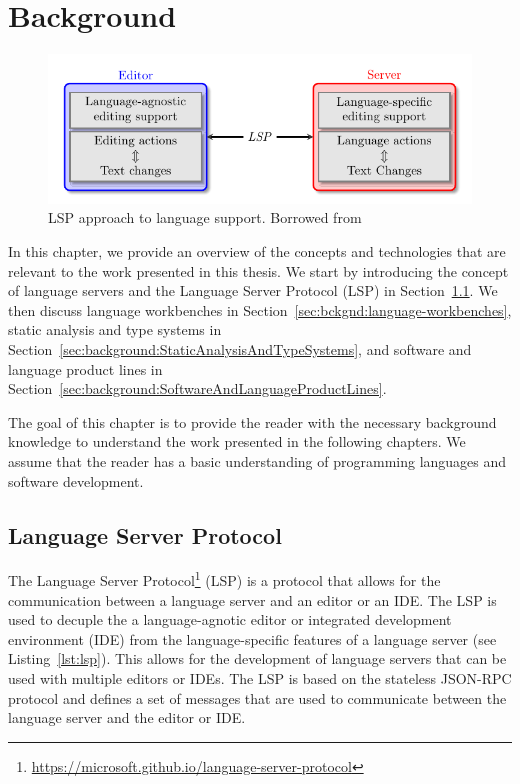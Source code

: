 \chapter{Background}\label{chap:Background}

\begin{figure}[t]
    \centering
    \includegraphics[width=0.9\linewidth]{figs/background/lsp_diagram.pdf}
    \caption{LSP approach to language support. Borrowed from~\cite{Rodriguez-Echeverria18a}}
    \label{lst:background:featuremodel}
\end{figure}

In this chapter, we provide an overview of the concepts and technologies that are relevant to the work presented in this thesis. We start by introducing the concept of language servers and the Language Server Protocol (LSP) in Section~\ref{sec:background:LanguageServerProtocol}. We then discuss language workbenches in Section~\ref{sec:bckgnd:language-workbenches}, static analysis and type systems in Section~\ref{sec:background:StaticAnalysisAndTypeSystems}, and software and language product lines in Section~\ref{sec:background:SoftwareAndLanguageProductLines}.

The goal of this chapter is to provide the reader with the necessary background knowledge to understand the work presented in the following chapters. We assume that the reader has a basic understanding of programming languages and software development.

\section{Language Server Protocol}\label{sec:background:LanguageServerProtocol}
The Language Server Protocol\footnote{\url{https://microsoft.github.io/language-server-protocol}} (LSP) is a protocol that allows for the communication between a language server and an editor or an IDE. The LSP is used to decuple the a language-agnotic editor or integrated development environment (IDE) from the language-specific features of a language server (see Listing~\ref{lst:lsp}). This allows for the development of language servers that can be used with multiple editors or IDEs. The LSP is based on the stateless JSON-RPC protocol and defines a set of messages that are used to communicate between the language server and the editor or IDE.

